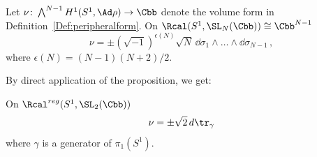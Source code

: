 \begin{prop}\label{prop:thetaSL}
Let $\nu\colon \bigwedge^{N-1} H^1(S^1,\Ad\rho)\to\Cbb$ denote the volume form in Definition~\ref{Def:peripheralform}. On $\Rcal(S^1, \SL_N (\Cbb))\cong\Cbb^{N-1}$
\[
\nu = \pm \left(\sqrt{-1}\right)^{\epsilon(N)} \sqrt N\, \dd\sigma_1\wedge\dots\wedge \dd\sigma_{N-1}\,,
\]
where $\epsilon(N)=(N-1)(N+2)/2$.
\end{prop}



By direct application of the proposition, we get:


\begin{coro}\label{cor:dtrace}
On $\Rcal^{reg}(S^1,\SL_2(\Cbb))$
\[
\nu =\pm \sqrt{2}\, d \tr_\gamma
\]
where $\gamma$ is a generator of $\pi_1(S^1)$.
\end{coro}


